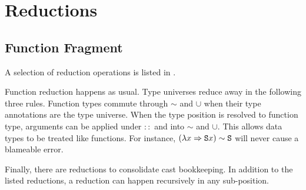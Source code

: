 \section{Reductions}
 
\subsection{Function Fragment}
A selection of reduction operations is listed in .

Function reduction happens as usual.
Type universes reduce away in the following three rules.
Function types commute through $\sim$ and $\cup$ when their type annotations are the type universe.
When the type position is resolved to function type, arguments can be applied under $::$ and into $\sim$ and $\cup$.
This allows data types to be treated like functions.
For instance, $(\lambda x \Rightarrow\mathtt{S}{} x) \sim \mathtt{S}{}$ will never cause a blameable error.
 
Finally, there are reductions to consolidate cast bookkeeping.
In addition to the listed reductions, a reduction can happen recursively in any sub-position.



